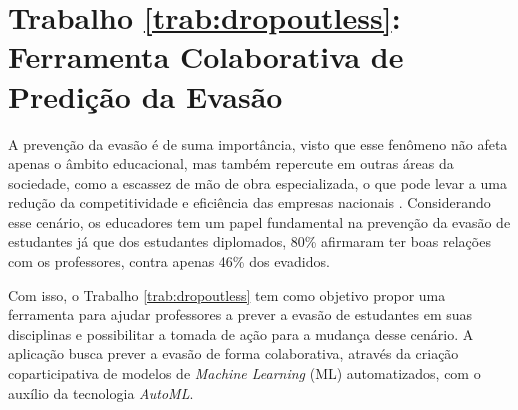 \documentclass[12pt]{article}
\begin{document}







\section{Trabalho \ref{trab:dropoutless}: Ferramenta Colaborativa de Predição da Evasão}

A prevenção da evasão é de suma importância, visto que esse fenômeno não afeta apenas o âmbito educacional, mas também repercute em outras áreas da sociedade, como a escassez de mão de obra especializada, o que pode levar a uma redução da competitividade e eficiência das empresas nacionais \cite{mussliner:2021}. Considerando esse cenário, os educadores tem um papel fundamental na prevenção da evasão de estudantes já que dos estudantes diplomados, 80\% afirmaram ter boas relações com os professores, contra apenas 46\% dos evadidos.

Com isso, o Trabalho \ref{trab:dropoutless} tem como objetivo propor uma ferramenta para ajudar professores a prever a evasão de estudantes em suas disciplinas e possibilitar a tomada de ação para a mudança desse cenário. A aplicação busca prever a evasão de forma colaborativa, através da criação coparticipativa de modelos de \textit{Machine Learning} (ML) automatizados, com o auxílio da tecnologia \textit{AutoML}.
\end{document}
